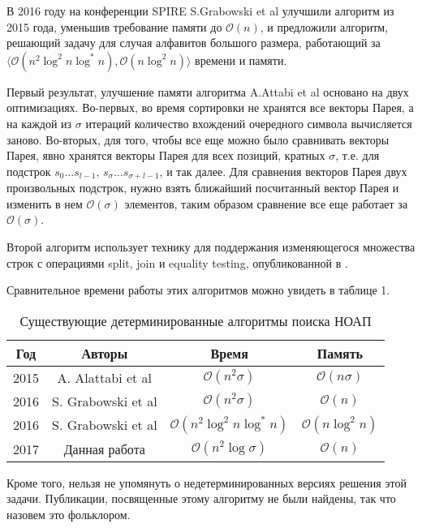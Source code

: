 В 2016 году на конференции SPIRE S.Grabowski et al \cite{4} улучшили алгоритм из \cite{1} 2015 года, уменьшив требование памяти до $\mathcal{O}(n)$, и предложили алгоритм, решающий задачу для случая алфавитов большого размера, работающий за $\langle \mathcal{O}(n^2 \log^2 n \log^* n), \mathcal{O}(n \log^2 n) \rangle$ времени и памяти. 

Первый результат, улучшение памяти алгоритма A.Attabi et al основано на двух оптимизациях. Во-первых, во время сортировки не хранятся все векторы Парея, а на каждой из $\sigma$ итераций количество вхождений очередного символа вычисляется заново. Во-вторых, для того, чтобы все еще можно было сравнивать векторы Парея, явно хранятся векторы Парея для всех позиций, кратных $\sigma$, т.е. для подстрок $s_0 \ldots s_{l-1}$, $s_\sigma \ldots s_{\sigma + l - 1}$, и так далее. Для сравнения векторов Парея двух произвольных подстрок, нужно взять ближайший посчитанный вектор Парея и изменить в нем $\mathcal{O}(\sigma)$ элементов, таким образом сравнение все еще работает за $\mathcal{O}(\sigma)$.

Второй алгоритм использует технику для поддержания изменяющегося множества строк с операциями split, join и equality testing, опубликованной в \cite{9}.


Сравнительное времени работы этих алгоритмов можно увидеть в таблице 1.

\begin{table}[H]
\begin{center}
\begin{tabular}{|c|c|c|c|}
\hline
Год & Авторы & Время & Память \\
\hline
2015 & A. Alattabi et al & $\mathcal{O}(n^2 \sigma)$ & $\mathcal{O}(n \sigma)$ \\
\hline
2016 & S. Grabowski et al & $\mathcal{O}(n^2 \sigma)$ & $\mathcal{O}(n)$ \\
\hline
2016 & S. Grabowski et al & $\mathcal{O}(n^2 \log^2 n \log^* n)$ & $\mathcal{O}(n \log^2 n)$ \\
\hline
2017 & Данная работа & $\mathcal{O}(n^2 \log \sigma)$ & $\mathcal{O}(n)$ \\
\hline
\end{tabular}
\end{center}
\caption{Существующие детерминированные алгоритмы поиска НОАП}
\end{table}

Кроме того, нельзя не упомянуть о недетерминированных версиях решения этой задачи. Публикации, посвященные этому алгоритму не были найдены, так что назовем это фольклором.

